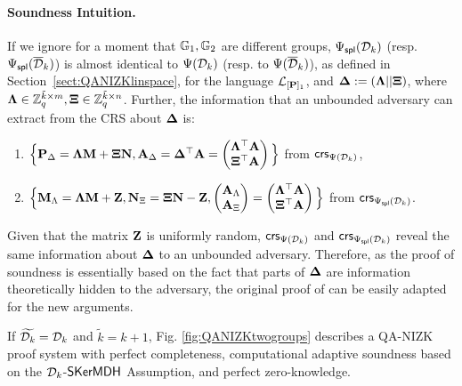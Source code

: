 \paragraph{Soundness Intuition.}   If we ignore for a moment that $\mathbb{G}_1, \mathbb{G}_2$ are different groups, ${\Psi_{\mathsf{spl}}(\mathcal{D}_k)}$ (resp. ${\Psi_\mathsf{spl}(\overline{\mathcal{D}}_k)}$) is almost identical to $\Psi({\mathcal{D}_k})$ (resp. to ${\Psi(\overline{\mathcal{D}}_k)}$), as defined in Section~\ref{sect:QANIZKlinspace}, for the language $\mathcal{L}_{[\mathbf{{P}}]_1}$, and $\mathbf{{\Delta}}:=(\mathbf{{\Lambda}}||\mathbf{{\Xi}})$, where  $\mathbf{{\Lambda}} \in \mathbb{Z}_q^{\tilde{k} \times m},\mathbf{{\Xi}} \in \mathbb{Z}_q^{\tilde{k} \times n}$. Further, the information that an unbounded adversary can extract from the CRS about $\mathbf{{\Delta}}$ is:
 \begin{enumerate}
 \item $\Big\{\mathbf{{P}}_\Delta= \mathbf{{\Lambda}} \mathbf{{M}}+ \mathbf{{\Xi}}\mathbf{{N}}, \mathbf{{A}}_{\Delta} = \mathbf{{\Delta}}^{\top}\mathbf{{A}} =\begin{pmatrix} \mathbf{{\Lambda}}^{\top}\mathbf{{A}} \\ \mathbf{{\Xi}}^{\top}\mathbf{{A}} \end{pmatrix}\Big\}$ from $\mathsf{crs}_{\Psi({\mathcal{D}_k})}$, 
 \item $\Big\{ \mathbf{{M}}_\Lambda = \mathbf{{\Lambda}} \mathbf{{M}}+\mathbf{{Z}}, \mathbf{{N}}_\Xi = \mathbf{{\Xi}}\mathbf{{N}}-\mathbf{{Z}},  \begin{pmatrix}\mathbf{{A}}_\Lambda\\\mathbf{{A}}_\Xi\end{pmatrix} = \begin{pmatrix} \mathbf{{\Lambda}}^{\top}\mathbf{{A}} \\ \mathbf{{\Xi}}^{\top}\mathbf{{A}} \end{pmatrix} \Big\}$ from $\mathsf{crs}_{{\Psi_{\mathsf{spl}}(\mathcal{D}_k)}}$. 
 \end{enumerate}
Given that the matrix $\mathbf{{Z}}$ is uniformly random,  $\mathsf{crs}_{\Psi({\mathcal{D}_k})}$ and $\mathsf{crs}_{{\Psi_{\mathsf{spl}}(\mathcal{D}_k)}}$
reveal the same information about $\mathbf{{\Delta}}$ to an unbounded adversary. Therefore, as the proof of soundness is essentially based on the fact that parts of $\mathbf{{\Delta}}$ are information theoretically hidden to the adversary, the original proof of \cite{EC:KilWee15} can be easily adapted for the new arguments. 

\begin{theorem} If $\widetilde{\mathcal{D}_{k}}=\mathcal{D}_k$ and $\tilde{k}=k+1$,  Fig. \ref{fig:QANIZKtwogroups} describes a QA-NIZK
proof system with perfect completeness, computational adaptive soundness based on the  $\mathcal{D}_{k}$-$\mathsf{SKerMDH}$ Assumption, and perfect zero-knowledge. 
\label{theo:membtwogroups1}
\end{theorem}

